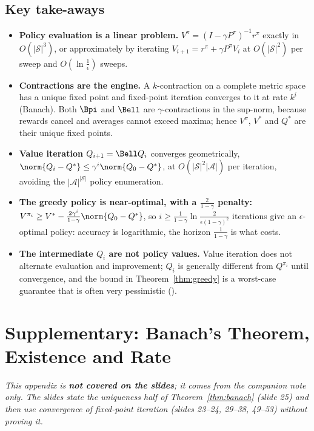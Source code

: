 \documentclass[11pt,a4paper]{article}
\newcommand{\cS}{\mathcal{S}}
\newcommand{\cA}{\mathcal{A}}
\theoremstyle{plain}
\theoremstyle{definition}
\theoremstyle{remark}
\begin{document}
\subsection{Key take-aways}
\begin{itemize}
  \item \textbf{Policy evaluation is a linear problem.} $V^\pi=(I-\gamma P^\pi)^{-1}r^\pi$ exactly in $O(|\cS|^3)$, or approximately by iterating $V_{i+1}=r^\pi+\gamma P^\pi V_i$ at $O(|\cS|^2)$ per sweep and $O(\ln\frac1\epsilon)$ sweeps.
  \item \textbf{Contractions are the engine.} A $k$-contraction on a complete metric space has a unique fixed point and fixed-point iteration converges to it at rate $k^i$ (Banach). Both $\Bpi$ and $\Bell$ are $\gamma$-contractions in the sup-norm, because rewards cancel and averages cannot exceed maxima; hence $V^\pi$, $V^*$ and $Q^*$ are their unique fixed points.
  \item \textbf{Value iteration} $Q_{i+1}=\Bell Q_i$ converges geometrically, $\norm{Q_i-Q^*}\le\gamma^i\norm{Q_0-Q^*}$, at $O(|\cS|^2|\cA|)$ per iteration, avoiding the $|\cA|^{|\cS|}$ policy enumeration.
  \item \textbf{The greedy policy is near-optimal, with a $\frac{2}{1-\gamma}$ penalty:} $V^{\pi_i}\ge V^*-\frac{2\gamma^i}{1-\gamma}\norm{Q_0-Q^*}$, so $i\ge\frac1{1-\gamma}\ln\frac2{\epsilon(1-\gamma)^2}$ iterations give an $\epsilon$-optimal policy: accuracy is logarithmic, the horizon $\frac1{1-\gamma}$ is what costs.
  \item \textbf{The intermediate $Q_i$ are not policy values.} Value iteration does not alternate evaluation and improvement; $Q_i$ is generally different from $Q^{\pi_i}$ until convergence, and the bound in Theorem~\ref{thm:greedy} is a worst-case guarantee that is often very pessimistic ().
\end{itemize}

\appendix
\section{Supplementary: Banach's Theorem, Existence and Rate}\label{app:banach}
\emph{This appendix is \textbf{not covered on the slides}; it comes from the companion note only. The slides state the uniqueness half of Theorem~\ref{thm:banach} (slide 25) and then use convergence of fixed-point iteration (slides 23--24, 29--38, 49--53) without proving it.}
\end{document}
